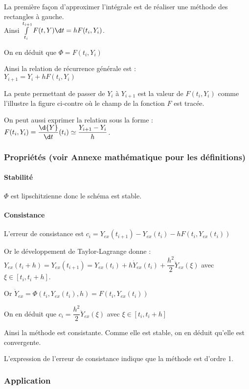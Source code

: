 \documentclass[10pt]{article}
\begin{document}
La première façon d'approximer l'intégrale est de réaliser une méthode des rectangles à gauche. \\
Ainsi $\int\limits_{t_i}^{t_{i+1}}   {F}(t,  {Y})\d t = h   {F}(t_i,  {Y}_i)$.

On en déduit que $  {\Phi} =   {F}(t_i,  {Y}_i) $

Ainsi la relation de récurrence générale est : \\$  {Y}_{i+1} =   {Y}_{i} + h  {F}(t_i,  {Y}_i)$

La pente permettant de passer de $  {Y}_{i}$ à $  {Y}_{i+1}$ est la valeur de $  {F}(t_i,  {Y}_i)$ comme l'illustre la figure ci-contre où le champ de la fonction $  {F}$ est tracée.


On peut aussi exprimer la relation sous la forme : $  {F}(t_i,  {Y}_i)=\dfrac{\d  {Y}}{\d t}(t_i) \simeq \dfrac{  {Y}_{i+1}-  {Y}_i}{h}$.  


\subsubsection{Propriétés (voir Annexe mathématique pour les définitions)}
\paragraph{Stabilité} $  {\Phi}$ est lipschitzienne donc le schéma est stable.

\paragraph{Consistance} L'erreur de consistance est $c_i =   {Y}_{ex}(t_{i+1})-  {Y}_{ex}(t_i)-h  {F}( t_i,  {Y}_{ex}(t_i))$

Or le développement de Taylor-Lagrange donne : 
$  {Y}_{ex}(t_{i}+h)=  {Y}_{ex}(t_{i+1}) = 
  {Y}_{ex}(t_{i})+h  {\dot Y}_{ex}(t_{i}) + \dfrac{h^2}{2}   {\ddot Y}_{ex}(\xi)$ avec $\xi\in[t_i,t_i+h]$.

Or $  {\dot Y}_{ex} =   {\Phi}(t_i,  {Y}_{ex}(t_i),h) =   {F}(t_i,  {Y}_{ex}(t_i))$

On en déduit que $c_i = \dfrac{h^2}{2}   {\ddot Y}_{ex}(\xi)$ avec $\xi\in[t_i,t_i+h]$

Ainsi la méthode est consistante. Comme elle est stable, on en déduit qu'elle est convergente. 

L'expression de l'erreur de consistance indique que la méthode est d'ordre 1.

\subsubsection{Application}
\end{document}
